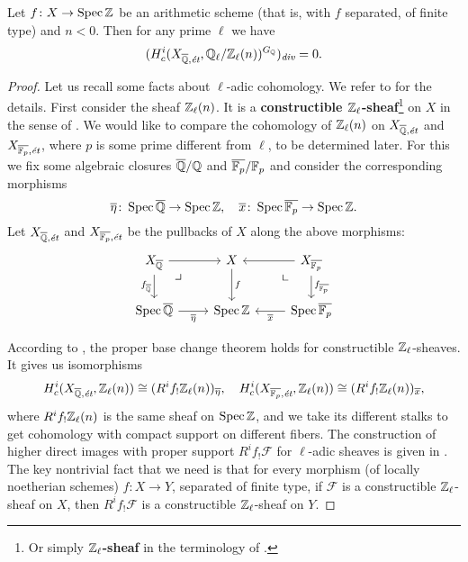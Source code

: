 \documentclass{article}
\numberwithin{equation}{section}
\begin{document}
\begin{proposition}
  \label{prop:l-adic-cohomology-key-lemma}
  Let $f\colon X\to \operatorname{Spec} \mathbb{Z}$ be an arithmetic scheme (that is, with $f$
  separated, of finite type) and $n < 0$. Then for any prime $\ell$ we have
  $$(H^i_c (X_{\overline{\mathbb{Q}},\text{\it ét}}, \mathbb{Q}_\ell/\mathbb{Z}_\ell (n))^{G_{\mathbb{Q}}})_{\text{\it div}} = 0.$$

  \begin{proof}
    Let us recall some facts about $\ell$-adic cohomology. We refer to
    \cite[Exposé~VI]{SGA5} for the details. First consider the sheaf
    $\mathbb{Z}_\ell (n)$. It is a
    \textbf{constructible $\mathbb{Z}_\ell$-sheaf}\footnote{Or simply
      \textbf{$\mathbb{Z}_\ell$-sheaf} in the terminology of \cite[Rapport]{SGA4-1-2}.}
    on $X$ in the sense of \cite[Exposé~VI, 1.1.1]{SGA5}. We would like to
    compare the cohomology of $\mathbb{Z}_\ell (n)$ on
    $X_{\overline{\mathbb{Q}},\text{\it ét}}$ and $X_{\overline{\mathbb{F}_p},\text{\it ét}}$,
    where $p$ is some prime different from $\ell$, to be determined later.
    For this we fix some algebraic closures $\overline{\mathbb{Q}}/\mathbb{Q}$ and
    $\overline{\mathbb{F}_p}/\mathbb{F}_p$ and consider the corresponding morphisms
    \[ \overline{\eta}\colon \operatorname{Spec} \overline{\mathbb{Q}} \to \operatorname{Spec} \mathbb{Z}, \quad
    \overline{x}\colon \operatorname{Spec} \overline{\mathbb{F}_p} \to \operatorname{Spec} \mathbb{Z}. \]
    Let $X_{\overline{\mathbb{Q}},\text{\it ét}}$ and
    $X_{\overline{\mathbb{F}_p},\text{\it ét}}$ be the pullbacks of $X$ along the above
    morphisms:
    \[ \begin{tikzcd}
      X_{\overline{\QQ}} \ar{r}\tikzpb\ar{d}[swap]{f_{\overline{\QQ}}} & X \ar{d}{f} & X_{\overline{\FF_p}} \ar{l}\ar{d}{f_{\overline{\FF_p}}}\tikzpbur \\
      \Spec \overline{\QQ} \ar{r}[swap]{\overline{\eta}} & \Spec \ZZ & \Spec \overline{\FF_p} \ar{l}{\overline{x}}
    \end{tikzcd} \]

    According to \cite[Exposé~VI, 2.2.3]{SGA5}, the proper base change theorem
    holds for constructible $\mathbb{Z}_\ell$-sheaves. It gives us isomorphisms
    \[ H^i_c (X_{\overline{\mathbb{Q}}, \text{\it ét}}, \mathbb{Z}_\ell (n)) \cong (R^i f_! \mathbb{Z}_\ell (n))_{\overline{\eta}}, \quad
    H^i_c (X_{\overline{\mathbb{F}_p}, \text{\it ét}}, \mathbb{Z}_\ell (n)) \cong (R^i f_! \mathbb{Z}_\ell (n))_{\overline{x}}, \]
    where $R^i f_! \mathbb{Z}_\ell (n)$ is the same sheaf on $\operatorname{Spec} \mathbb{Z}$, and we take
    its different stalks to get cohomology with compact support on different
    fibers. The construction of higher direct images with proper support
    $R^i f_! \mathcal{F}$ for $\ell$-adic sheaves is given in
    \cite[Exposé~VI, \S 2.2]{SGA5}. The key nontrivial fact that we need is that
    for every morphism (of locally noetherian schemes) $f\colon X\to Y$,
    separated of finite type, if $\mathcal{F}$ is a constructible
    $\mathbb{Z}_\ell$-sheaf on $X$, then $R^i f_! \mathcal{F}$ is a constructible
    $\mathbb{Z}_\ell$-sheaf on $Y$.


\end{proof}
\end{proposition}
\end{document}
